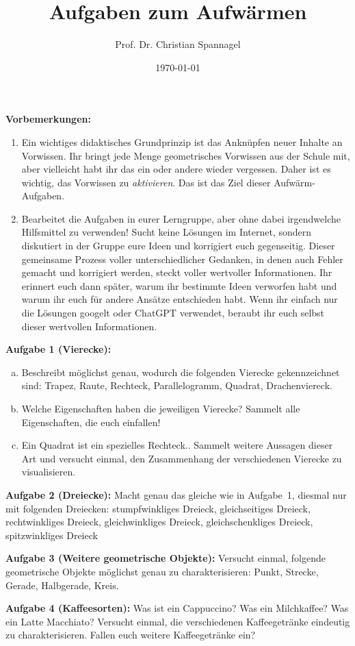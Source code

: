 \documentclass{../cssheet}
\title{Aufgaben zum Aufwärmen}
\author{Prof. Dr. Christian Spannagel}
\date{\today}
\begin{document}
\printtitle

\textbf{Vorbemerkungen:} 
\begin{enumerate}
\item Ein wichtiges didaktisches Grundprinzip ist das Anknüpfen neuer Inhalte an Vorwissen. Ihr bringt jede Menge geometrisches Vorwissen aus der Schule mit, aber vielleicht habt ihr das ein oder andere wieder vergessen. Daher ist es wichtig, das Vorwissen zu \emph{aktivieren}. Das ist das Ziel dieser Aufwärm-Aufgaben.
\item Bearbeitet die Aufgaben in eurer Lerngruppe, aber ohne dabei irgendwelche Hilfsmittel zu verwenden! Sucht keine Lösungen im Internet, sondern diskutiert in der Gruppe eure Ideen und korrigiert euch gegenseitig. Dieser gemeinsame Prozess voller unterschiedlicher Gedanken, in denen auch Fehler gemacht und korrigiert werden, steckt voller wertvoller Informationen. Ihr erinnert euch dann später, warum ihr bestimmte Ideen verworfen habt und warum ihr euch für andere Ansätze entschieden habt. Wenn ihr einfach nur die Lösungen googelt oder ChatGPT verwendet, beraubt ihr euch selbst dieser wertvollen Informationen.
\end{enumerate}


\textbf{Aufgabe 1 (Vierecke):}  
\begin{enumerate}[a)]
\item Beschreibt möglichst genau, wodurch die folgenden Vierecke gekennzeichnet sind: Trapez, Raute, Rechteck, Parallelogramm, Quadrat, Drachenviereck.
\item Welche Eigenschaften haben die jeweiligen Vierecke? Sammelt alle Eigenschaften, die euch einfallen!
\item \glqq{}Ein Quadrat ist ein spezielles Rechteck.\grqq{}. Sammelt weitere Aussagen dieser Art und versucht einmal, den Zusammenhang der verschiedenen Vierecke zu visualisieren.
\end{enumerate}

\textbf{Aufgabe 2 (Dreiecke):} Macht genau das gleiche wie in Aufgabe~1, diesmal nur mit folgenden Dreiecken: stumpfwinkliges Dreieck, gleichseitiges Dreieck, rechtwinkliges Dreieck, gleichwinkliges Dreieck, gleichschenkliges Dreieck, spitzwinkliges Dreieck

\textbf{Aufgabe 3 (Weitere geometrische Objekte):} Versucht einmal, folgende geometrische Objekte möglichst genau zu charakterisieren: Punkt, Strecke, Gerade, Halbgerade, Kreis.

\textbf{Aufgabe 4 (Kaffeesorten):} Was ist ein Cappuccino? Was ein Milchkaffee? Was ein Latte Macchiato? Versucht einmal, die verschiedenen Kaffeegetränke eindeutig zu charakterisieren. Fallen euch weitere Kaffeegetränke ein?


\vspace*{10mm}
\printlicense

\printsocials


\end{document}
